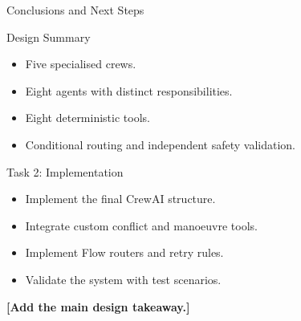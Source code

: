 

\begin{frame}{Conclusions and Next Steps}

\begin{block}{Design Summary}
\begin{itemize}
    \item Five specialised crews.
    \item Eight agents with distinct responsibilities.
    \item Eight deterministic tools.
    \item Conditional routing and independent
    safety validation.
\end{itemize}
\end{block}

\begin{block}{Task 2: Implementation}
\begin{itemize}
    \item Implement the final CrewAI structure.
    \item Integrate custom conflict and
    manoeuvre tools.
    \item Implement Flow routers and retry rules.
    \item Validate the system with test scenarios.
\end{itemize}
\end{block}

\vspace{0.2cm}

\centering
\textbf{[Add the main design takeaway.]}

\end{frame}
